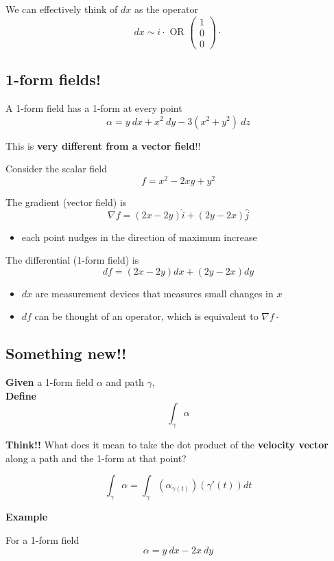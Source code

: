 We can effectively think of $dx$ as the operator
\[
   dx \sim i \cdot \text{ OR } \begin{pmatrix} 1 \\ 0 \\ 0 \end{pmatrix} \cdot 
\] 

\subsection{1-form fields!}
A 1-form field has a 1-form at every point
\[
  \alpha = y\ dx + x^2\ dy - 3(x^2 + y^2)\ dz
\] 

This is \textbf{very different from a vector field}!!

Consider the scalar field
\[
  f = x^2 - 2xy + y^2
\] 

The gradient (vector field) is 
\[
  \nabla f = \left( 2x-2y \right) \hat{i} + (2y-2x) \hat{j}
\] 
\begin{itemize}
   \item each point nudges in the direction of maximum increase
\end{itemize}

The differential (1-form field) is
\[
  df = \left( 2x-2y \right) dx + (2y-2x) dy
\] 
\begin{itemize}
   \item $dx$ are measurement devices that measures small changes in $x$ 
   \item $df$ can be thought of an operator, which is equivalent to $\nabla f \cdot$
\end{itemize}

\subsection{Something new!!}

\textbf{Given} a 1-form field $\alpha$ and path $\gamma$,  \\

\textbf{Define}
\[
   \int_{\gamma} \alpha
\]  

\textbf{Think!!} What does it mean to take the dot product of the \textbf{velocity vector} along a path and the 1-form at that point?

\[
   \int_{\gamma} \alpha = \int_{\gamma} \left( \alpha_{\gamma(t)} \right) \left( \gamma ' \left( t \right)  \right) dt
\]  

\textbf{Example}

For a 1-form field
\[
  \alpha = y\ dx - 2x\ dy
\] 

